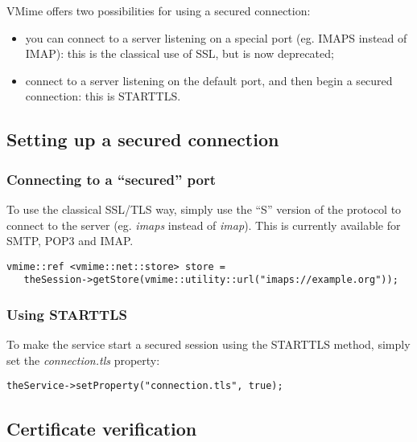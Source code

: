VMime offers two possibilities for using a secured connection:

\begin{itemize}
\item you can connect to a server listening on a special port (eg. IMAPS
instead of IMAP): this is the classical use of SSL, but is now deprecated;
\item connect to a server listening on the default port, and then begin a
secured connection: this is STARTTLS.
\end{itemize}


\subsection{Setting up a secured connection} %

\subsubsection{Connecting to a ``secured'' port} %

To use the classical SSL/TLS way, simply use the ``S'' version of the protocol
to connect to the server (eg. \emph{imaps} instead of \emph{imap}). This is
currently available for SMTP, POP3 and IMAP.

\begin{lstlisting}
vmime::ref <vmime::net::store> store =
   theSession->getStore(vmime::utility::url("imaps://example.org"));
\end{lstlisting}

\subsubsection{Using STARTTLS} %

To make the service start a secured session using the STARTTLS method, simply
set the \emph{connection.tls} property:

\begin{lstlisting}
theService->setProperty("connection.tls", true);
\end{lstlisting}


\subsection{Certificate verification} %

